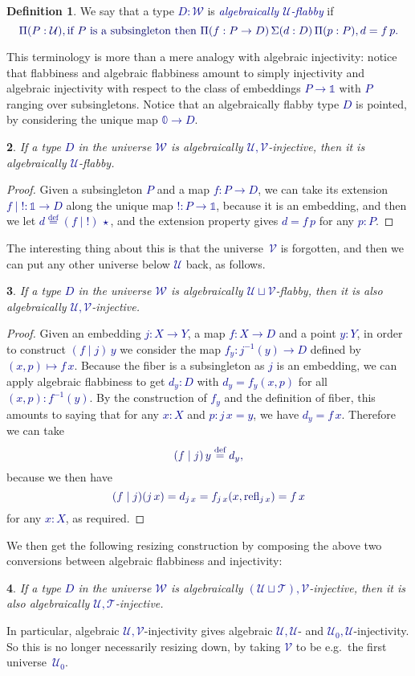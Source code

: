 \documentclass[10pt]{article}
\newcommand{\db}{\textcolor{darkblue}}
\newcommand{\df}[1]{\emph{\db{#1}}}
\newcommand{\m}[1]{\db{$#1$}}
\newcommand{\M}[1]{\[\db{#1}\]}
\newcommand{\U}{\mathcal{U}}
\newcommand{\V}{\mathcal{V}}
\newcommand{\W}{\mathcal{W}}
\newcommand{\T}{\mathcal{T}}
\newcommand{\Zero}{\mathbb{0}}
\newcommand{\One}{\mathbb{1}}
\newcommand{\one}{\operatorname{\star}}
\newcommand{\refl}{\operatorname{refl}}
\newcommand{\eqdef}{\overset{\text{def}}{=}}
\newtheorem{numbered}{}
\theoremstyle{definition}
\newtheorem{definition}[numbered]{Definition}
\begin{document}
\begin{definition}
  We say that a type \m{D : \W} is \df{algebraically \m{\U}-flabby} if
%
\M{
  \Pi (P : \U), \text{if \m{P} is a subsingleton then \m{\Pi(f : P \to D)\, \Sigma (d : D)\, \Pi(p : P), d = f \, p}.}
}
%
\end{definition}
\noindent This terminology is more than a mere analogy with
algebraic injectivity: notice that flabbiness and algebraic flabbiness
amount to simply injectivity and algebraic injectivity with respect to
the class of embeddings \m{P \to \One} with \m{P} ranging over
subsingletons. Notice that an algebraically flabby type \m{D} is pointed, by considering the unique map \m{\Zero \to D}.

\begin{numbered}
  If a type \m{D} in the universe \m{\W} is algebraically
  \m{\U,\V}-injective, then it is algebraically \m{\U}-flabby.
\end{numbered}
\begin{proof}
  Given a subsingleton \m{P} and a map \m{f : P \to D}, we can take its extension \m{f \mid \operatorname{!}: \One \to D} along the unique map \m{!:P \to \One}, because it is an embedding, and then we let \m{d \eqdef (f \mid \operatorname{!})\, \one}, and the extension property gives \m{d = f \, p} for any \m{p:P}.
\end{proof}
The interesting thing about this is that the
universe~\m{\V} is forgotten, and then we can put any other universe
below \m{\U} back, as follows.

\begin{numbered}
  If a type \m{D} in the universe \m{\W} is algebraically \m{\U \sqcup
    \V}-flabby, then it is also algebraically \m{\U,\V}-injective.
\end{numbered}
\begin{proof}
  Given an embedding \m{j : X \to Y}, a map \m{f : X \to D} and a
  point \m{y:Y}, in order to construct \m{(f \mid j) \, y} we consider
  the map \m{f_y : j^{-1}(y) \to D} defined by \m{(x,p) \mapsto
    f\,x}. Because the fiber is a subsingleton as \m{j} is an
  embedding, we can apply algebraic flabbiness to get \m{d_y : D} with
  \m{d_y = f_y (x,p)} for all \m{(x,p):f^{-1}(y)}. By the construction of
  \m{f_y} and the definition of fiber, this amounts to saying that for
  any \m{x : X} and \m{p : j \, x = y}, we have \m{d_y = f \,
    x}. Therefore we can take
%
\M{(f \mid j) \, y \eqdef d_y,}
because we then have
%
\M{(f \mid j) (j \, x) = d_{j \, x} = f_{j \, x} (x , \refl_{j \, x}) = f \, x}
%
for any \m{x:X}, as required.
\end{proof}
\noindent We then get the following resizing construction by composing the above
two conversions between algebraic flabbiness and injectivity:
\begin{numbered}
  If a type \m{D} in the universe \m{\W} is algebraically \m{(\U \sqcup
    \T),\V}-injective, then it is also algebraically \m{\U,\T}-injective.
\end{numbered}
\noindent In particular, algebraic \m{\U,\V}-injectivity gives
algebraic \m{\U,\U}- and \m{\U_0,\U}-injectivity.  So this is no
longer necessarily resizing down, by taking \m{\V} to be
e.g.\ the first universe~\m{\U_0}.
\end{document}
